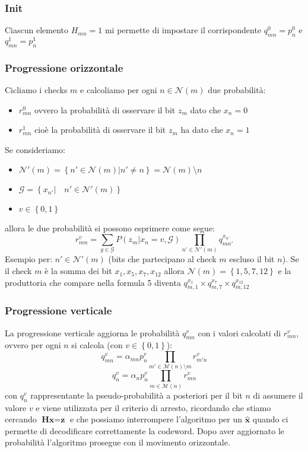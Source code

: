 \documentclass{article}
\begin{document}
	\subsubsection{Init}
	Ciascun elemento $H_{mn} = 1$ mi permette di impostare il corrispondente $q^0_{mn} = p^0_n$ e $q^1_{mn} = p^1_n$
	\subsubsection{Progressione orizzontale}
	Cicliamo i checks $m$ e calcoliamo per ogni $n \in \mathcal{N}(m)$ due probabilità:
	\begin{itemize}
		\item $r^0_{mn}$ ovvero la probabilità di osservare il bit $z_m$ dato che $x_n =0$
		\item $r^1_{mn}$ cioè la probabilità di osservare il bit $z_m$ ha dato che $x_n =1$
	\end{itemize}
	Se consideriamo:
	\begin{itemize}
		\item $\mathcal{N}'(m)=\left\{n' \in \mathcal{N}(m)| n' \neq n\right\} = \mathcal{N}(m) \setminus n$
		\item $\mathcal{G}=\left\{x_{n'} | \quad n' \in \mathcal{N}'(m) \right\}$ 
		\item $v \in \left\{0,1\right\}$
	\end{itemize}
	allora le due probabilità si possono esprimere come segue:
	\begin{equation}
		r^v_{mn}= \sum_{g \in \mathcal{G}} P(z_m|x_n = v, \mathcal{G}) \prod_{n' \in \mathcal{N}'(m)} q^{x_{n'}}_{mn'}
	\end{equation}
	Esempio per: $n' \in \mathcal{N}'(m)$ (bits che partecipano al check $m$ escluso il bit $n$). Se il check $m$ è la somma dei bit $x_1, x_5, x_7, x_{12}$ allora $\mathcal{N}(m) = \left\{ 1,5,7,12\right\}$ e la produttoria che compare nella formula 5 diventa $q_{m,1}^{x_1} \times q_{m, 7}^{x_7} \times q_{m,12}^{x_{12}}$  
	\subsubsection{Progressione verticale}
	La progressione verticale aggiorna le probabilità $q^v_{mn}$ con i valori calcolati di $r^v_{mn}$, ovvero per ogni $n$ si calcola (con $v \in \left\{0,1\right\}$):
	\begin{equation}
		q^v_{mn} = \alpha_{mn} p^v_n \prod_{m' \in \mathcal{M}(n)\setminus m} r^v_{m'n}
	\end{equation}
	\begin{equation}
		q^v_{n} = \alpha_{n} p^v_n \prod_{m \in \mathcal{M}(n)} r^v_{mn}
	\end{equation}
	con $q^v_{n}$ rappresentante la pseudo-probabilità a posteriori per il bit $n$ di assumere il valore $v$ e viene utilizzata per il criterio di arresto, ricordando che stiamo cercando $\textbf{Hx}=\textbf{z}$ e che possiamo interrompere l'algoritmo per un $\hat{\textbf{x}}$ quando ci permette di decodificare correttamente la codeword.
	Dopo aver aggiornato le probabilità l'algoritmo prosegue con il movimento orizzontale.
\end{document}
